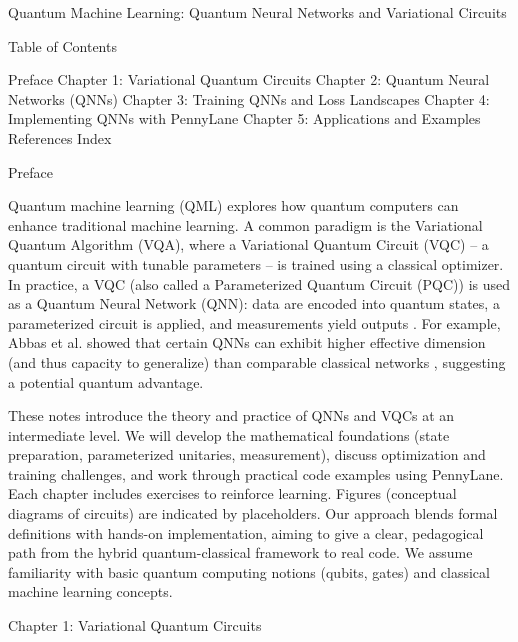 Quantum Machine Learning: Quantum Neural Networks and Variational Circuits







Table of Contents





Preface
Chapter 1: Variational Quantum Circuits
Chapter 2: Quantum Neural Networks (QNNs)
Chapter 3: Training QNNs and Loss Landscapes
Chapter 4: Implementing QNNs with PennyLane
Chapter 5: Applications and Examples
References
Index






Preface





Quantum machine learning (QML) explores how quantum computers can enhance traditional machine learning.  A common paradigm is the Variational Quantum Algorithm (VQA), where a Variational Quantum Circuit (VQC) – a quantum circuit with tunable parameters – is trained using a classical optimizer.  In practice, a VQC (also called a Parameterized Quantum Circuit (PQC)) is used as a Quantum Neural Network (QNN): data are encoded into quantum states, a parameterized circuit is applied, and measurements yield outputs .  For example, Abbas et al. showed that certain QNNs can exhibit higher effective dimension (and thus capacity to generalize) than comparable classical networks , suggesting a potential quantum advantage.



These notes introduce the theory and practice of QNNs and VQCs at an intermediate level.  We will develop the mathematical foundations (state preparation, parameterized unitaries, measurement), discuss optimization and training challenges, and work through practical code examples using PennyLane.  Each chapter includes exercises to reinforce learning.  Figures (conceptual diagrams of circuits) are indicated by placeholders.  Our approach blends formal definitions with hands-on implementation, aiming to give a clear, pedagogical path from the hybrid quantum-classical framework to real code.  We assume familiarity with basic quantum computing notions (qubits, gates) and classical machine learning concepts.





Chapter 1: Variational Quantum Circuits





